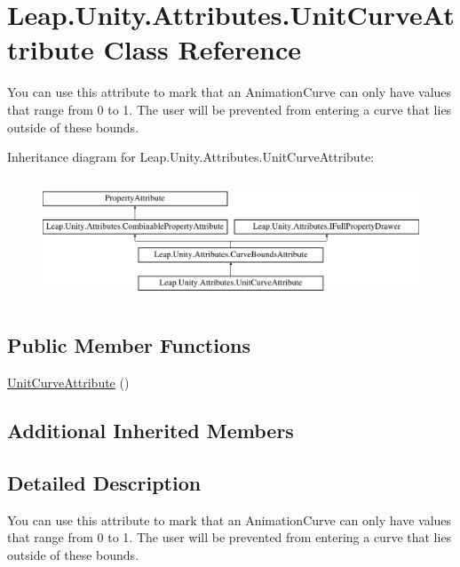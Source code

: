 \hypertarget{class_leap_1_1_unity_1_1_attributes_1_1_unit_curve_attribute}{}\section{Leap.\+Unity.\+Attributes.\+Unit\+Curve\+Attribute Class Reference}
\label{class_leap_1_1_unity_1_1_attributes_1_1_unit_curve_attribute}


You can use this attribute to mark that an Animation\+Curve can only have values that range from 0 to 1. The user will be prevented from entering a curve that lies outside of these bounds.  


Inheritance diagram for Leap.\+Unity.\+Attributes.\+Unit\+Curve\+Attribute\+:\begin{figure}[H]
\begin{center}
\leavevmode
\includegraphics[height=3.696370cm]{class_leap_1_1_unity_1_1_attributes_1_1_unit_curve_attribute}
\end{center}
\end{figure}
\subsection*{Public Member Functions}
\begin{DoxyCompactItemize}
\item 
\mbox{\hyperlink{class_leap_1_1_unity_1_1_attributes_1_1_unit_curve_attribute_a09ca907549acb6c744691be347e1de18}{Unit\+Curve\+Attribute}} ()
\end{DoxyCompactItemize}
\subsection*{Additional Inherited Members}


\subsection{Detailed Description}
You can use this attribute to mark that an Animation\+Curve can only have values that range from 0 to 1. The user will be prevented from entering a curve that lies outside of these bounds. 



